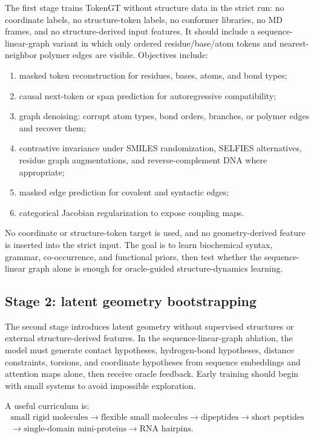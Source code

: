 \documentclass[11pt]{article}
\begin{document}
The first stage trains TokenGT without structure data in the strict run: no coordinate labels, no structure-token labels, no conformer libraries, no MD frames, and no structure-derived input features. It should include a sequence-linear-graph variant in which only ordered residue/base/atom tokens and nearest-neighbor polymer edges are visible. Objectives include:
\begin{enumerate}[leftmargin=2em]
  \item masked token reconstruction for residues, bases, atoms, and bond types;
  \item causal next-token or span prediction for autoregressive compatibility;
  \item graph denoising: corrupt atom types, bond orders, branches, or polymer edges and recover them;
  \item contrastive invariance under SMILES randomization, SELFIES alternatives, residue graph augmentations, and reverse-complement DNA where appropriate;
  \item masked edge prediction for covalent and syntactic edges;
  \item categorical Jacobian regularization to expose coupling maps.
\end{enumerate}

No coordinate or structure-token target is used, and no geometry-derived feature is inserted into the strict input. The goal is to learn biochemical syntax, grammar, co-occurrence, and functional priors, then test whether the sequence-linear graph alone is enough for oracle-guided structure-dynamics learning.

\subsection{Stage 2: latent geometry bootstrapping}

The second stage introduces latent geometry without supervised structures or external structure-derived features. In the sequence-linear-graph ablation, the model must generate contact hypotheses, hydrogen-bond hypotheses, distance constraints, torsions, and coordinate hypotheses from sequence embeddings and attention maps alone, then receive oracle feedback. Early training should begin with small systems to avoid impossible exploration.

A useful curriculum is:
\[
\begin{gathered}
\text{small rigid molecules}\to
\text{flexible small molecules}\to
\text{dipeptides}\to
\text{short peptides}\\
\to\text{single-domain mini-proteins}\to
\text{RNA hairpins}.
\end{gathered}
\]
\end{document}

